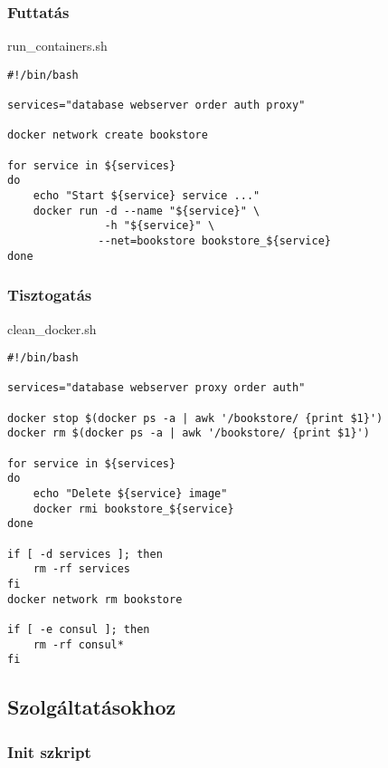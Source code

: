 \subsubsection{\texorpdfstring{Futtatás\label{appendix-runner}}{Futtatás}}\label{futtatuxe1s}

run\_containers.sh

\begin{verbatim}
#!/bin/bash

services="database webserver order auth proxy"

docker network create bookstore

for service in ${services}
do
    echo "Start ${service} service ..."
    docker run -d --name "${service}" \
               -h "${service}" \
              --net=bookstore bookstore_${service}
done
\end{verbatim}

\subsubsection{\texorpdfstring{Tisztogatás\label{appendix-cleanup}}{Tisztogatás}}\label{tisztogatuxe1s}

clean\_docker.sh

\begin{verbatim}
#!/bin/bash

services="database webserver proxy order auth"

docker stop $(docker ps -a | awk '/bookstore/ {print $1}')
docker rm $(docker ps -a | awk '/bookstore/ {print $1}')

for service in ${services}
do
    echo "Delete ${service} image"
    docker rmi bookstore_${service}
done

if [ -d services ]; then
    rm -rf services
fi
docker network rm bookstore

if [ -e consul ]; then
    rm -rf consul*
fi
\end{verbatim}

\subsection{Szolgáltatásokhoz}\label{szolguxe1ltatuxe1sokhoz}

\subsubsection{\texorpdfstring{Init
szkript\label{appendix-starter}}{Init szkript}}\label{init-szkript}

